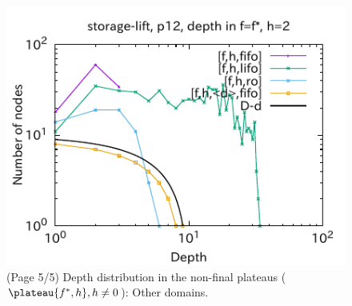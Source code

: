 \begin{figure}[htbp]
\includegraphics{img/output-lmcut/storage-lift/p12-2.pdf}
 \caption{(Page 5/5) Depth distribution in the non-final plateaus ($\plateau{f^*,h}, h\not=0$): Other domains.}
 \label{fig:depth-histogram5}
\end{figure}

